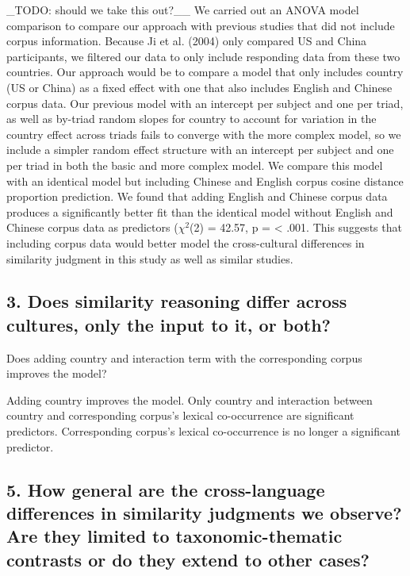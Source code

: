 \documentclass[10pt, letterpaper]{article}
\begin{document}
\_TODO: should we take this out?\_\_ We carried out an ANOVA model
comparison to compare our approach with previous studies that did not
include corpus information. Because Ji et al. (2004) only compared US
and China participants, we filtered our data to only include responding
data from these two countries. Our approach would be to compare a model
that only includes country (US or China) as a fixed effect with one that
also includes English and Chinese corpus data. Our previous model with
an intercept per subject and one per triad, as well as by-triad random
slopes for country to account for variation in the country effect across
triads fails to converge with the more complex model, so we include a
simpler random effect structure with an intercept per subject and one
per triad in both the basic and more complex model. We compare this
model with an identical model but including Chinese and English corpus
cosine distance proportion prediction. We found that adding English and
Chinese corpus data produces a significantly better fit than the
identical model without English and Chinese corpus data as predictors
(\(\chi^2\)(2) = 42.57, p = \textless{} .001. This suggests that
including corpus data would better model the cross-cultural differences
in similarity judgment in this study as well as similar studies.

\hypertarget{does-similarity-reasoning-differ-across-cultures-only-the-input-to-it-or-both}{%
\subsection{3. Does similarity reasoning differ across cultures, only
the input to it, or
both?}\label{does-similarity-reasoning-differ-across-cultures-only-the-input-to-it-or-both}}

Does adding country and interaction term with the corresponding corpus
improves the model?

Adding country improves the model. Only country and interaction between
country and corresponding corpus's lexical co-occurrence are significant
predictors. Corresponding corpus's lexical co-occurrence is no longer a
significant predictor.

\hypertarget{how-general-are-the-cross-language-differences-in-similarity-judgments-we-observe-are-they-limited-to-taxonomic-thematic-contrasts-or-do-they-extend-to-other-cases}{%
\subsection{5. How general are the cross-language differences in
similarity judgments we observe? Are they limited to taxonomic-thematic
contrasts or do they extend to other
cases?}\label{how-general-are-the-cross-language-differences-in-similarity-judgments-we-observe-are-they-limited-to-taxonomic-thematic-contrasts-or-do-they-extend-to-other-cases}}
\end{document}
